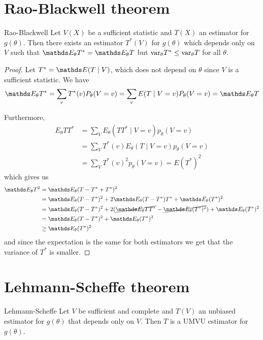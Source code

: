 \documentclass[12pt]{extarticle}
\begin{document}
\section{Rao-Blackwell theorem}

\begin{theorem}{Rao-Blackwell}{}
	Let $V(X)$ be a sufficient statistic and $T(X)$ an estimator for $g(\theta)$.
	Then there exists an estimator $T^*(V)$ for $g(\theta)$ which depends only on $V$
	such that $\E_\theta T^* = \E_\theta T$ but $\var_\theta T^* \leq \var_\theta T$ for all $\theta$.
\end{theorem}

\begin{proof}
	Let $T^* = \E(T \mid V)$, which does not depend on $\theta$ since $V$ is a sufficient statistic.
	We have
	\begin{equation}
		\E_\theta T^* = \sum_v T^*(v) P_\theta(V = v) = \sum_v E(T\mid V = v) P_\theta(V = v) = \E_\theta T
	\end{equation}

	Furthermore,
	\begin{align}
		E_\theta T T^* & = \sum_V E_\theta(T T^* \mid V = v) p_\theta(V = v)     \\
		               & = \sum_V T^*(v) E_\theta(T \mid V = v) p_\theta (V = v) \\
		               & = \sum_V T^*(v)^2 p_\theta(V = v) = E(T^*)^2
	\end{align}
	which gives us
	\begin{align}
		\E_\theta T^2 & = \E_\theta (T - T^* + T^*)^2                                                                       \\
		              & = \E_\theta(T - T^*)^2 + 2 \E_\theta(T-T^*) T^* + \E_\theta(T^*)^2                                  \\
		              & = \E_\theta(T - T^*)^2 + 2( \cancel{\E_\theta TT^*} - \cancel{\E_\theta(T^*)^2}) + \E_\theta(T^*)^2 \\
		              & = \E_\theta(T - T^*)^2 + \E_\theta(T^*)^2                                                           \\
		              & \geq \E_\theta(T^*)^2
	\end{align}
	and since the expectation is the same for both estimators we get that the variance of $T^*$ is smaller.
\end{proof}

\section{Lehmann-Scheffe theorem}
\begin{theorem}{Lehmann-Scheffe}{}
	Let $V$ be sufficient and complete and $T(V)$ an unbiased estimator for $g(\theta)$
	that depends only on $V$.
	Then $T$ is a UMVU estimator for $g(\theta)$.
\end{theorem}
\end{document}
